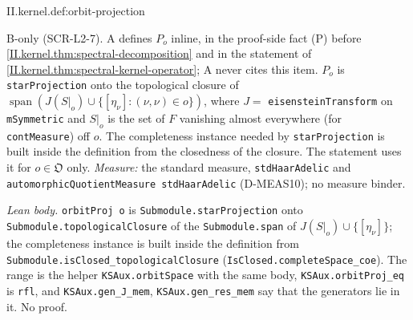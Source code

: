 \begin{definition}
\bonly
{}
\end{definition}
\begin{tfformal}{II.kernel.def:orbit-projection}
\begin{tffidelity}
B-only (SCR-L2-7). A defines $P_o$ inline, in the proof-side fact (P) before \cref{II.kernel.thm:spectral-decomposition} and in the statement of \cref{II.kernel.thm:spectral-kernel-operator}; A never cites this item. $P_o$ is \texttt{starProjection} onto the topological closure of $\operatorname{span}(J(S|_o)\cup\{[\eta_\nu]:(\nu,\nu)\in o\})$, where $J=$ \texttt{eisensteinTransform} on \texttt{mSymmetric} and $S|_o$ is the set of $F$ vanishing almost everywhere (for \texttt{contMeasure}) off $o$. The completeness instance needed by \texttt{starProjection} is built inside the definition from the closedness of the closure. The statement uses it for $o\in\mathfrak O$ only. \emph{Measure:} the standard measure, \texttt{stdHaarAdelic} and \texttt{automorphicQuotientMeasure stdHaarAdelic} (D-MEAS10); no measure binder. 
\end{tffidelity}
\end{tfformal}
\noindent\emph{Lean body.} \texttt{orbitProj o} is \texttt{Submodule.starProjection} onto \texttt{Submodule.topologicalClosure} of the \texttt{Submodule.span} of $J(S|_o)\cup\{[\eta_\nu]\}$; the completeness instance is built inside the definition from \texttt{Submodule.isClosed\_topologicalClosure} (\texttt{IsClosed.completeSpace\_coe}). The range is the helper \texttt{KSAux.orbitSpace} with the same body, \texttt{KSAux.orbitProj\_eq} is \texttt{rfl}, and \texttt{KSAux.gen\_J\_mem}, \texttt{KSAux.gen\_res\_mem} say that the generators lie in it. No proof.

